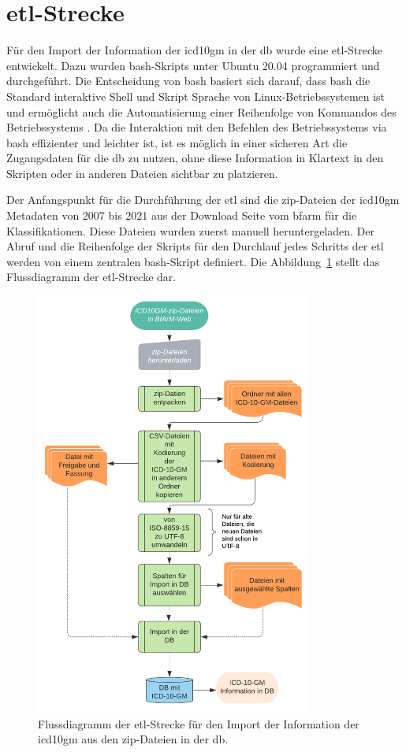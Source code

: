 \section{\acs{etl}-Strecke} \label{sec:etlpipeline}

Für den Import der Information der \ac{icd10gm} in der \ac{db} wurde eine \ac{etl}-Strecke entwickelt. Dazu wurden \ac{bash}-Skripts unter Ubuntu 20.04 programmiert und durchgeführt. Die Entscheidung von \ac{bash} basiert sich darauf, dass \ac{bash} die Standard interaktive Shell und Skript Sprache von Linux-Betriebssystemen ist und ermöglicht auch die Automatisierung einer Reihenfolge von Kommandos des Betriebssystems \cite{bash}. Da die Interaktion mit den Befehlen des Betriebssystems via \ac{bash} effizienter und leichter ist, ist es möglich in einer sicheren Art die Zugangsdaten für die \ac{db} zu nutzen, ohne diese Information in Klartext in den Skripten oder in anderen Dateien sichtbar zu platzieren.

Der Anfangspunkt für die Durchführung der \ac{etl} sind die \ac{zip}-Dateien der \ac{icd10gm} Metadaten von 2007 bis 2021 aus der Download Seite vom \ac{bfarm} für die Klassifikationen. Diese Dateien wurden zuerst manuell heruntergeladen. Der Abruf und die Reihenfolge der Skripts für den Durchlauf jedes Schritts der \ac{etl} werden von einem zentralen \ac{bash}-Skript definiert. Die Abbildung~\ref{fig:etl} stellt das Flussdiagramm der \ac{etl}-Strecke dar.

\clearpage
\begin{figure}[ht]
	\centering
	\includegraphics[height=14cm]{figures/etl}
	\caption[\acs{etl}-Strecke]{Flussdiagramm der \acs{etl}-Strecke für den Import der Information der \ac{icd10gm} aus den \ac{zip}-Dateien in der \ac{db}.}
	\label{fig:etl}
\end{figure} 

